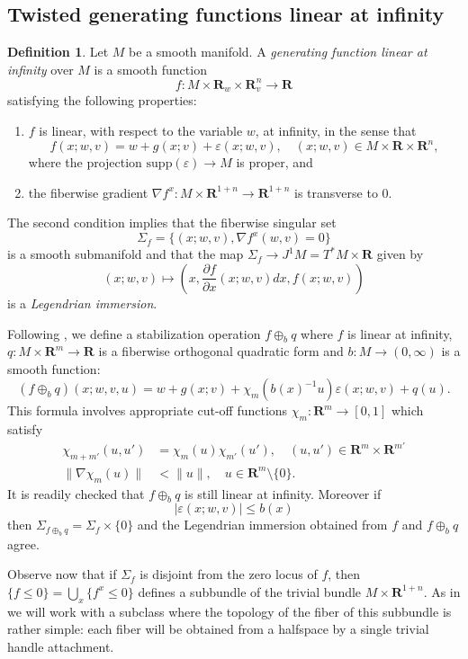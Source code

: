 \documentclass[reqno]{amsart}
\renewcommand{\epsilon}{\varepsilon}
\theoremstyle{theorem}
\theoremstyle{remark}
\theoremstyle{definition}
\newtheorem{definition}[corollary]{Definition}
\newcommand{\bR}{\mathbf{R}}
\newcommand{\R}{\mathbf{R}}
\begin{document}
\subsection{Twisted generating functions linear at infinity}


\begin{definition}
Let $M$ be a smooth manifold. A \emph{generating function linear at infinity} over $M$ is a smooth function
\begin{equation}
    f:M\times \R_{w} \times \R_{v}^n\to \R
\end{equation}
satisfying the following properties:
\begin{enumerate}
\item $f$ is linear, with respect to the variable $w$, at infinity, in the sense that 
\[f(x;w,v)=w+g(x;v) + \varepsilon(x;w,v), \quad (x;w,v) \in M \times \bR \times \bR^n,\]
where the projection $\text{supp}(\varepsilon) \to M$ is proper, and
\item the fiberwise gradient $\nabla  f^x:M\times \R^{1+n}\to \R^{1+n}$ is transverse to $0$.
\end{enumerate}
\end{definition}
The second condition implies that the fiberwise singular set 
\[\Sigma_f=\{(x;w,v), \nabla f^x (w,v)=0\}\]
is a smooth submanifold and that the map $\Sigma_f \to J^1 M=T^*M \times \R$ given by
$$(x;w,v)\mapsto \left(x, \frac{\partial f}{\partial x}(x;w,v)dx, f(x;w,v)\right)$$
is a \emph{Legendrian immersion}.


Following \cite{ACGK}, we define a stabilization operation $f\oplus_b q$ where $f$ is linear at infinity, $q:M\times \R^m\to \R$ is a fiberwise orthogonal quadratic form and $b:M\to (0,\infty)$ is a smooth function:
\[(f\oplus_b q) (x;w,v,u)=w+g(x;v)+\chi_m(b(x)^{-1} u)\epsilon(x;w,v)+q(u).\]
 This formula involves appropriate cut-off functions $\chi_m:\R^m\to [0,1]$ which satisfy
 \begin{align*}
   \chi_{m+m'}(u,u')& =\chi_m(u)\chi_{m'}(u'), \quad (u,u')\in\R^m\times \R^{m'} \\
\|\nabla \chi_m(u)\| & <\|u\|, \quad u\in \R^m\setminus\{0\}.
 \end{align*}
It is readily checked that $f\oplus_b q$ is still linear at infinity. Moreover if 
\[|\epsilon(x;w,v)|\leq b(x)\]
then
$\Sigma_{f\oplus_b q}=\Sigma_f\times\{0\}$ and the Legendrian immersion obtained from $f$
and $f\oplus_b q$ agree.


Observe now that if $\Sigma_f$ is disjoint from the zero locus of $f$, then $\{ f \leq 0 \} = \bigcup_x\{f^x \leq 0\}$
defines a subbundle of the trivial bundle $M\times \R^{1+n}$. As in \cite{ACGK} we will work with a subclass
where the topology of the fiber of this subbundle is rather simple: each fiber will be obtained from a halfspace by a single
trivial handle attachment.
\end{document}
